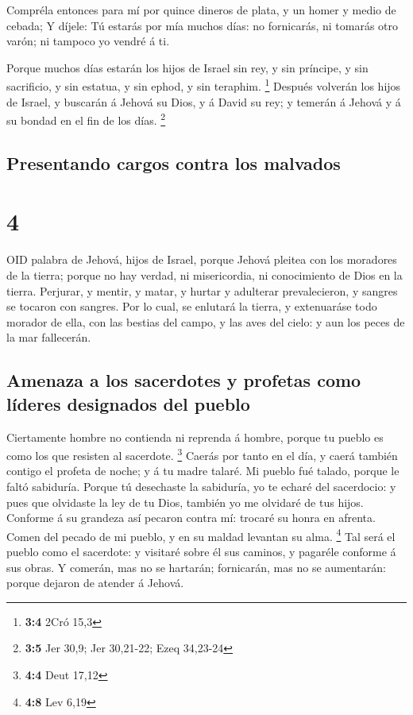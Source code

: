  Compréla entonces para mí por quince dineros de plata, y un
homer y medio de cebada;  Y díjele: Tú estarás por mía
muchos días: no fornicarás, ni tomarás otro varón; ni tampoco yo vendré
á ti.

 Porque muchos días estarán los hijos de Israel sin rey, y
sin príncipe, y sin sacrificio, y sin estatua, y sin ephod, y sin
teraphim. \footnote{\textbf{3:4} 2Cró 15,3}  Después
volverán los hijos de Israel, y buscarán á Jehová su Dios, y á David su
rey; y temerán á Jehová y á su bondad en el fin de los días. \footnote{\textbf{3:5}
  Jer 30,9; Jer 30,21-22; Ezeq 34,23-24}

\hypertarget{presentando-cargos-contra-los-malvados}{%
\subsection{Presentando cargos contra los
malvados}\label{presentando-cargos-contra-los-malvados}}

\hypertarget{section-3}{%
\section{4}\label{section-3}}

 OID palabra de Jehová, hijos de Israel, porque Jehová
pleitea con los moradores de la tierra; porque no hay verdad, ni
misericordia, ni conocimiento de Dios en la tierra. 
Perjurar, y mentir, y matar, y hurtar y adulterar prevalecieron, y
sangres se tocaron con sangres.  Por lo cual, se enlutará la
tierra, y extenuaráse todo morador de ella, con las bestias del campo, y
las aves del cielo: y aun los peces de la mar fallecerán.

\hypertarget{amenaza-a-los-sacerdotes-y-profetas-como-luxedderes-designados-del-pueblo}{%
\subsection{Amenaza a los sacerdotes y profetas como líderes designados
del
pueblo}\label{amenaza-a-los-sacerdotes-y-profetas-como-luxedderes-designados-del-pueblo}}

 Ciertamente hombre no contienda ni reprenda á hombre,
porque tu pueblo es como los que resisten al sacerdote. \footnote{\textbf{4:4}
  Deut 17,12}  Caerás por tanto en el día, y caerá también
contigo el profeta de noche; y á tu madre talaré.  Mi pueblo
fué talado, porque le faltó sabiduría. Porque tú desechaste la
sabiduría, yo te echaré del sacerdocio: y pues que olvidaste la ley de
tu Dios, también yo me olvidaré de tus hijos.  Conforme á su
grandeza así pecaron contra mí: trocaré su honra en afrenta.
 Comen del pecado de mi pueblo, y en su maldad levantan su
alma. \footnote{\textbf{4:8} Lev 6,19}  Tal será el pueblo
como el sacerdote: y visitaré sobre él sus caminos, y pagaréle conforme
á sus obras.  Y comerán, mas no se hartarán; fornicarán,
mas no se aumentarán: porque dejaron de atender á Jehová.

